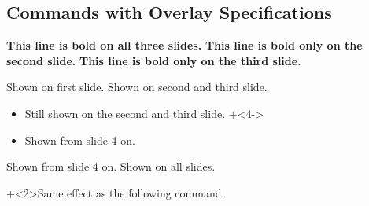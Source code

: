          \subsection{Commands with Overlay Specifications}
         \begin{frame}
         \textbf{This line is bold on all three slides.}
         \textbf<2>{This line is bold only on the second slide.}
         \textbf<3>{This line is bold only on the third slide.}
         \end{frame}
         \begin{frame}
         \end{frame}
         \begin{frame}
         Shown on first slide.
         Shown on second and third slide.
         \begin{itemize}
         \item
         Still shown on the second and third slide.
         \onslide+<4->
         \item
         Shown from slide 4 on.
         \end{itemize}
         Shown from slide 4 on.
         \onslide
         Shown on all slides.
         \end{frame}
         \begin{frame}
         \onslide+<2>{Same effect as the following command.}
         \end{frame}
         \begin{frame}
         \end{frame}
